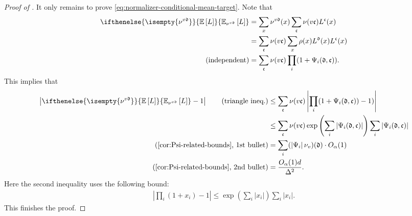\documentclass[a4paper,12pt]{article}
\theoremstyle{plain}
\theoremstyle{definition}
\def\!#1{\mathfrak{#1}} %
\def\!#1{\mathfrak{#1}} %
\def\oE{\mathbb{E}}
\newcommand{\E}[2][]{ \ifthenelse{\isempty{#1}}
  {\oE\left[#2\right]}
  {\oE_{#1}\left[#2\right]} }
\newcommand{\tuple}[1]{\left(#1\right)}
\newcommand{\tp}{\tuple}
\newcommand{\abs}[1]{\left\vert#1\right\vert}
\begin{document}
\begin{proof}[Proof of ]
It only remains to prove \eqref{eq:normalizer-conditional-mean-target}.
Note that 
\begin{align*}
  \E[\nu^{v\!d}]{L}
  &= \sum_{x} \nu^{v\!d}(x) \sum_{\!c} \nu(v\!c) L^{\!c}(x) \\
  &= \sum_{\!c}\nu(v\!c) \sum_{x} \rho(x) L^{\!d}(x) L^{\!c}(x) \\
  \tag{independent}
  &= \sum_{\!c}\nu(v\!c) \prod_{i} (1 + \Psi_i(\!d,\!c)).
\end{align*}
This implies that
\begin{align*}
  \abs{\E[\nu^{v\!d}]{L}-1}
  \tag{triangle ineq.}
  &\leq \sum_{\!c}\nu(v\!c)\abs{\prod_{i} (1 + \Psi_i(\!d,\!c))-1)} \\
  &\leq \sum_{\!c}\nu(v\!c)\exp\tp{\sum_i \abs{\Psi_i(\!d,\!c)}} \sum_i \abs{\Psi_i(\!d,\!c)} \\
  \tag{\Cref{cor:Psi-related-bounds}, 1st bullet}
  &= \sum_i(\abs{\Psi_i}\nu_v)(\!d) \cdot O_\alpha(1) \\
  \tag{\Cref{cor:Psi-related-bounds}, 2nd bullet}
  &= \frac{O_\alpha(1)d}{\Delta^2}.
\end{align*}
Here the second inequality uses the following bound:
\begin{align*}
  \abs{\prod_i(1+x_i)-1}
  \leq
  \exp\tp{\sum_i\abs{x_i}}
  \sum_i\abs{x_i}.
\end{align*}
This finishes the proof.
%
%
%

\end{proof}
\end{document}
